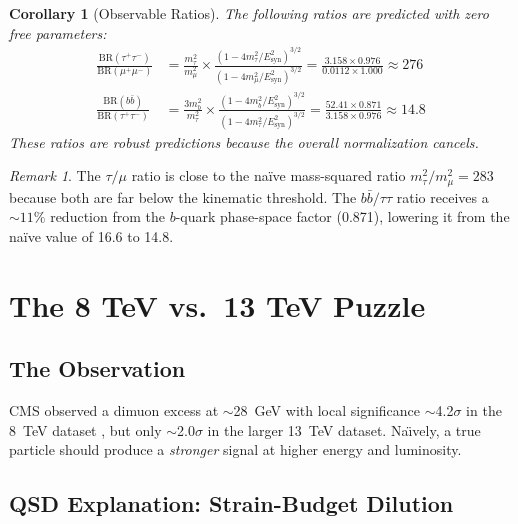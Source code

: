 \documentclass[11pt,a4paper]{article}
\newtheorem{corollary}[theorem]{Corollary}
\theoremstyle{definition}
\theoremstyle{remark}
\newtheorem{remark}[theorem]{Remark}
\newcommand{\Esyn}{E_{\mathrm{syn}}}
\begin{document}
\begin{corollary}[Observable Ratios]
The following ratios are predicted with zero free parameters:
\begin{align}
\frac{\mathrm{BR}(\tau^+\tau^-)}{\mathrm{BR}(\mu^+\mu^-)} &= \frac{m_\tau^2}{m_\mu^2} \times \frac{(1 - 4m_\tau^2/\Esyn^2)^{3/2}}{(1 - 4m_\mu^2/\Esyn^2)^{3/2}} = \frac{3.158 \times 0.976}{0.0112 \times 1.000} \approx 276 \label{eq:taumuratio} \\[6pt]
\frac{\mathrm{BR}(b\bar{b})}{\mathrm{BR}(\tau^+\tau^-)} &= \frac{3 m_b^2}{m_\tau^2} \times \frac{(1 - 4m_b^2/\Esyn^2)^{3/2}}{(1 - 4m_\tau^2/\Esyn^2)^{3/2}} = \frac{52.41 \times 0.871}{3.158 \times 0.976} \approx 14.8 \label{eq:btauratio}
\end{align}
These ratios are robust predictions because the overall normalization cancels.
\end{corollary}

\begin{remark}
The $\tau/\mu$ ratio is close to the na\"{i}ve mass-squared ratio $m_\tau^2/m_\mu^2 = 283$ because both are far below the kinematic threshold. The $b\bar{b}/\tau\tau$ ratio receives a ${\sim}11\%$ reduction from the $b$-quark phase-space factor (0.871), lowering it from the na\"{i}ve value of 16.6 to 14.8.
\end{remark}

\section{The 8 TeV vs.\ 13 TeV Puzzle}
\label{sec:puzzle}

\subsection{The Observation}

CMS observed a dimuon excess at $\sim$28~GeV with local significance $\sim$4.2$\sigma$ in the 8~TeV dataset \cite{CMS2018dimuon}, but only $\sim$2.0$\sigma$ in the larger 13~TeV dataset. Na\"{\i}vely, a true particle should produce a \emph{stronger} signal at higher energy and luminosity.

\subsection{QSD Explanation: Strain-Budget Dilution}
\end{document}
